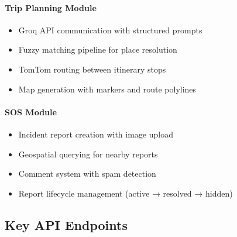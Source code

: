 \paragraph{Trip Planning Module}
\begin{itemize}[noitemsep]
    \item Groq API communication with structured prompts
    \item Fuzzy matching pipeline for place resolution
    \item TomTom routing between itinerary stops
    \item Map generation with markers and route polylines
\end{itemize}

\paragraph{SOS Module}
\begin{itemize}[noitemsep]
    \item Incident report creation with image upload
    \item Geospatial querying for nearby reports
    \item Comment system with spam detection
    \item Report lifecycle management (active → resolved → hidden)
\end{itemize}

\subsection{Key API Endpoints}

